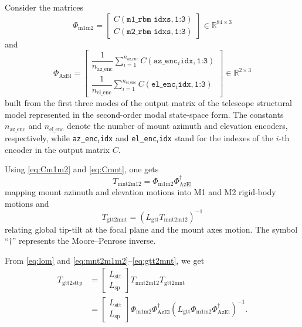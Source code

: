 \documentclass{gmto}
\begin{document}
Consider the matrices 
\begin{equation} \label{eq:Cm1m2}
    \Phi_\text{m1m2} = \begin{bmatrix}
    C\left(\texttt{m1\_rbm idxs},\texttt{1:3}\right) \\
    C\left(\texttt{m2\_rbm idxs},\texttt{1:3}\right)
\end{bmatrix}
\in \mathbb{R}^{84 \times 3}
\end{equation}
and
\begin{equation} \label{eq:Cmnt}
    \Phi_\text{AzEl} = \begin{bmatrix}
    \dfrac{1}{n_\text{az\_enc}} \sum\limits_{i=1}^{n_\text{az\_enc}} C\left(\texttt{az\_enc$_i$idx},\texttt{1:3}\right) \\
    \dfrac{1}{n_\text{el\_enc}} 
    \sum\limits_{i=1}^{n_\text{el\_enc}}
    C\left(\texttt{el\_enc$_i$idx},\texttt{1:3}\right)
\end{bmatrix}
\in \mathbb{R}^{2 \times 3}
\end{equation}
built from the first three modes of the output matrix of the telescope structural model represented in the second-order modal state-space form. 
The constants $n_\text{az\_enc}$ and $n_\text{el\_enc}$ denote the number of mount azimuth and elevation encoders, respectively, while \texttt{az\_enc$_i$idx} and \texttt{el\_enc$_i$idx} stand for the indexes of the $i$-th encoder in the output matrix $C$.

Using \eqref{eq:Cm1m2} and \eqref{eq:Cmnt}, one gets 
\begin{equation} \label{eq:mnt2m1m2}
    T_\text{mnt2m12} = \Phi_\text{m1m2} \Phi_\text{AzEl}^\dagger
\end{equation}
mapping mount azimuth and elevation motions into M1 and M2 rigid-body motions and
\begin{equation} \label{eq:gtt2mnt}
    T_\text{gtt2mnt} =  \left(L_\text{gtt} T_\text{mnt2m12}\right)^{-1}
\end{equation}
relating global tip-tilt at the focal plane and the mount axes motion. The symbol ``$\dagger$'' represents the Moore–Penrose inverse.

From \eqref{eq:lom} and \eqref{eq:mnt2m1m2}--\eqref{eq:gtt2mnt}, we get
\begin{align}
   T_\text{gtt2sttp} & = \begin{bmatrix}
    L_\text{stt} \\ L_\text{sp}
\end{bmatrix} T_\text{mnt2m12}T_\text{gtt2mnt} \nonumber \\
\label{eq:gtt2sttp}
    & = \begin{bmatrix}
    L_\text{stt} \\ L_\text{sp}
\end{bmatrix} \Phi_\text{m1m2} \Phi_\text{AzEl}^\dagger \left(  L_\text{gtt}  \Phi_\text{m1m2} \Phi_\text{AzEl}^\dagger \right)^{-1} .
\end{align}
\end{document}
